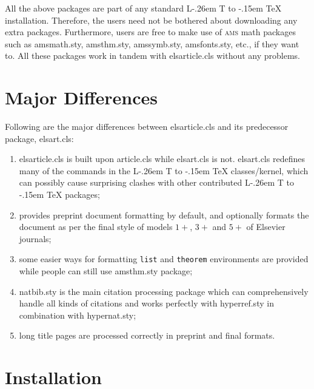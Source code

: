 \documentclass[a4paper,12pt]{article}
\makeatletter
\def\file#1{\textsf{#1}\xspace}
\DeclareRobustCommand{\LaTeX}{L\kern-.26em%
	        {\sbox\z@ T%
	         \vbox to\ht\z@{\hbox{\check@mathfonts
	           \fontsize\sf@size\z@
	           \math@fontsfalse\selectfont
	          A\,}%
	         \vss}%
	        }%
	     \kern-.15em%
	    \TeX}
\makeatother
\begin{document}
	All the above packages are part of any standard \LaTeX{} installation.
	Therefore, the users need not be bothered about downloading any
	extra packages.  Furthermore, users are free to make use of \textsc{ams}
	math packages such as \file{amsmath.sty}, \file{amsthm.sty},
	\file{amssymb.sty}, \file{amsfonts.sty}, etc., if they want to.  All
	these packages work in tandem with \file{elsarticle.cls} without
	any problems.
	
	\section{Major Differences}
	
	Following are the major differences between \file{elsarticle.cls}
	and its predecessor package, \file{elsart.cls}:
	
	\begin{enumerate}
\item \file{elsarticle.cls} is built upon \file{article.cls} while \file{elsart.cls} is not. \file{elsart.cls} redefines 	many of the commands in the \LaTeX{} classes/kernel, which can possibly cause surprising clashes with other contributed 	\LaTeX{} packages;
	
	\item provides preprint document formatting by default, and 	optionally formats the document as per the final 	style of models $1+$, $3+$ and $5+$ of Elsevier journals;
	
	\item some easier ways for formatting \verb+list+ and 	\verb+theorem+ environments are provided while people can still 	use \file{amsthm.sty} package;
	
	\item \file{natbib.sty} is the main citation processing package  which can comprehensively handle all kinds of citations and works perfectly with \file{hyperref.sty} in combination with \file{hypernat.sty};
	
	\item long title pages are processed correctly in preprint and final formats.
	
	\end{enumerate}
	
	\section{Installation}
	
\end{document}
